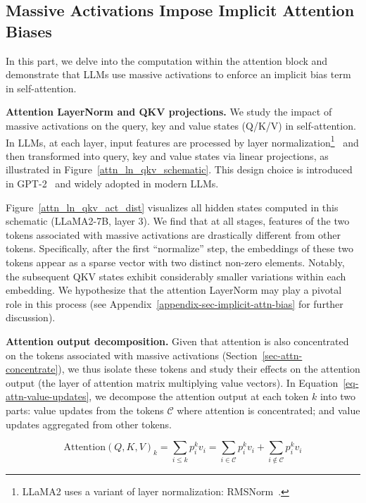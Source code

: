 \subsection{Massive Activations Impose Implicit Attention Biases}\label{sec-implicit-attn-bias}
In this part, we delve into the computation within the attention block and demonstrate that LLMs use massive activations to enforce an implicit bias term in self-attention.

\textbf{Attention LayerNorm and QKV projections.} We study the impact of massive activations on the query, key and value states (Q/K/V) in self-attention. In LLMs, at each layer, input features are processed by layer normalization\footnote{LLaMA2 uses a variant of layer normalization: RMSNorm~\citep{zhang2019rmsnorm}.}~\citep{ba2016layernorm} and then transformed into query, key and value states via linear projections, as illustrated in Figure~\ref{attn_ln_qkv_schematic}.
This design choice is introduced in GPT-2~\citep{radford2019gpt2} and widely adopted in modern LLMs. 

Figure~\ref{attn_ln_qkv_act_dist} visualizes all hidden states computed in this schematic (LLaMA2-7B, layer 3). We find that at all stages, features of the two tokens associated with massive activations are drastically different from other tokens. Specifically, after the first ``normalize'' step, the embeddings of these two tokens appear as a sparse vector with two distinct non-zero elements. Notably, the subsequent QKV states exhibit considerably smaller variations within each embedding. We hypothesize that the attention LayerNorm may play a pivotal role in this process (see Appendix~\ref{appendix-sec-implicit-attn-bias} for further discussion).

\textbf{Attention output decomposition.} Given that attention is also concentrated on the tokens associated with massive activations (Section~\ref{sec-attn-concentrate}), we thus isolate these tokens and study their effects on the attention output (the layer of attention matrix multiplying value vectors). In Equation~\ref{eq-attn-value-updates}, we decompose the attention output at each token $k$ into two parts: value updates from the tokens $\mathcal{C}$ where attention is concentrated; and value updates aggregated from other tokens.

\begin{equation}\label{eq-attn-value-updates}
    \text{Attention}(Q, K, V)_{k} = \sum_{i\le k}p^{k}_{i}v_{i}=\sum_{i\in \mathcal{C}}p^{k}_{i}v_{i}+\sum_{i\notin \mathcal{C}}p^{k}_{i}v_{i}
\end{equation}

